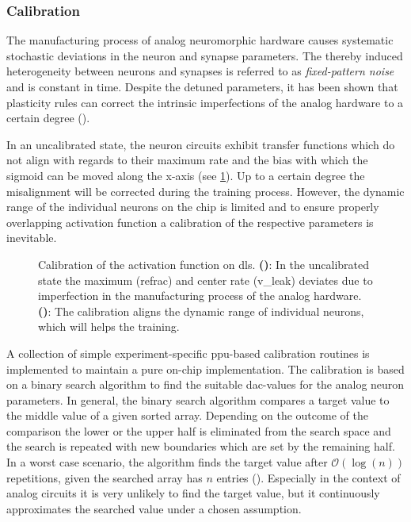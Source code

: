 \subsubsection*{Calibration}\label{calibration}
The manufacturing process of analog neuromorphic hardware causes systematic stochastic deviations in the neuron and synapse parameters. The thereby induced heterogeneity between neurons and synapses is referred to as \emph{fixed-pattern noise} and is constant in time. Despite the detuned parameters, it has been shown that plasticity rules can correct the intrinsic imperfections of the analog hardware to a certain degree (\citealp{wunderlich2019advantages}).

In an uncalibrated state, the neuron circuits exhibit transfer functions which do not align with regards to their maximum rate and the bias with which the sigmoid can be moved along the x-axis (see \cref{transferfunction_wout_calib}). Up to a certain degree the misalignment will be corrected during the training process. However, the dynamic range of the individual neurons on the chip is limited and to ensure properly overlapping activation function a calibration of the respective parameters is inevitable.
\begin{figure}
	\centering
	\begin{subfigure}[b]{0.49\textwidth}
		\caption{}
		
		\label{transferfunction_wout_calib}
	\end{subfigure}
	\begin{subfigure}[b]{0.49\textwidth}		
		\caption{}
		
		\label{transferfunction_w_calib}
	\end{subfigure}
	\caption[Calibration of the sigmoid activation function on \acrshort{dls}.]{Calibration of the activation function on \acrshort{dls}. \textbf{()}: In the uncalibrated state the maximum (\gls{refrac}) and center rate (\gls{v_leak}) deviates due to imperfection in the manufacturing process of the analog hardware.  \textbf{()}: The calibration aligns the dynamic range of individual neurons, which will helps the training.}
\end{figure}

A collection of simple experiment-specific \gls{ppu}-based calibration routines is implemented to maintain a pure on-chip implementation. The calibration is based on a binary search algorithm to find the suitable \gls{dac}-values for the analog neuron parameters. In general, the binary search algorithm compares a target value to the middle value of a given sorted array. Depending on the outcome of the comparison the lower or the upper half is eliminated from the search space and the search is repeated with new boundaries which are set by the remaining half. In a worst case scenario, the algorithm finds the target value after $\mathcal{O}(\log(n))$ repetitions, given the searched array has $n$ entries  (\citealp{binarysearchsource}). Especially in the context of analog circuits it is very unlikely to find the target value, but it continuously approximates the searched value under a chosen assumption.


